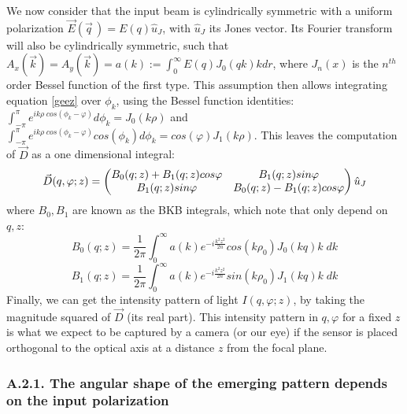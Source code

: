 \documentclass[11pt, a4paper, twoside]{article} %
\begin{document}
We now consider that the input beam is cylindrically symmetric with a uniform polarization $\vec{E}(\vec{q}\,)=E(q)\hat{u}_J$, with $\hat{u}_J$ its Jones vector. Its Fourier transform will also be cylindrically symmetric, such that $A_x(\vec{k})=A_y(\vec{k})=a(k):=\int_0^\infty E(q)J_0(qk)k dr$, where $J_n(x)$ is the $n^{th}$ order Bessel function of the first type. This assumption then allows integrating equation \eqref{geez}
over $\phi_k$, using the Bessel function identities: $\int_{-\pi}^{\pi}e^{ik\rho\;cos(\phi_k-\varphi)}d\phi_k=J_0(k\rho)$ and $\int_{-\pi}^{\pi}e^{ik\rho\;cos(\phi_k-\varphi)}cos(\phi_k)d\phi_k=cos(\varphi)J_1(k\rho)$. This leaves the computation of $\vec{D}$ as a one dimensional integral:\vspace{0.1cm}
\begin{equation}\label{master}
\vec{D}(q, \varphi;z)=\begin{pmatrix}
B_0(q;z)+B_1(q;z)cos\varphi & B_1(q;z) sin\varphi\\
B_1(q;z)sin\varphi & B_0(q;z)-B_1(q;z)cos\varphi
\end{pmatrix}\hat{u}_J\vspace{0.1cm}
\end{equation}
where $B_0,B_1$ are known as the BKB integrals, which note that only depend on $q,z$:
\begin{equation}\label{bkb1}
B_0(q;z)=\frac{1}{2\pi}\int_0^\infty a(k)e^{-i\frac{k^2z^2}{2n}}cos(k\rho_0)J_0(kq)k\;dk
\end{equation}
\begin{equation}\label{bkb2}
B_1(q;z)=\frac{1}{2\pi}\int_0^\infty a(k)e^{-i\frac{k^2z^2}{2n}}sin(k\rho_0)J_1(kq)k\;dk
\end{equation}
Finally, we can get the intensity pattern of light $I(q,\varphi;z)$, by taking the magnitude squared of $\vec{D}$ (its real part). This intensity pattern in $q,\varphi$ for a fixed $z$ is what we expect to be captured by a camera (or our eye) if the sensor is placed orthogonal to the optical axis at a distance $z$ from the focal plane.

\subsubsection*{A.2.1. The angular shape of the emerging pattern depends on the input polarization}
\end{document}
